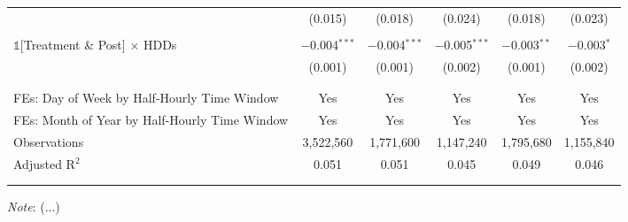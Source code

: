 \begin{table}[!htbp]
\begin{tabular}{@{\extracolsep{20pt}}lccccc}
& (0.015) & (0.018) & (0.024) & (0.018) & (0.023) \\
& & \\
$\mathbb{1}$[Treatment \& Post] $\times$ HDDs & $-$0.004$^{***}$ & $-$0.004$^{***}$ & $-$0.005$^{***}$ & $-$0.003$^{**}$ & $-$0.003$^{*}$ \\
& (0.001) & (0.001) & (0.002) & (0.001) & (0.002) \\
& & \\
\hline
\\[-2.0ex]
FEs: Day of Week by Half-Hourly Time Window & Yes & Yes & Yes & Yes & Yes \\
FEs: Month of Year by Half-Hourly Time Window & Yes & Yes & Yes & Yes & Yes \\
Observations & 3,522,560 & 1,771,600 & 1,147,240 & 1,795,680 & 1,155,840 \\
Adjusted R$^{2}$ & 0.051 & 0.051 & 0.045 & 0.049 & 0.046 \\
\\[-2.0ex]
\hline \hline
\\[-4.5ex]
\end{tabular}
\begin{tablenotes}
    \small
    \textit{Note}: (...)  %
\end{tablenotes}
\label{Table:}  %
\end{table}
